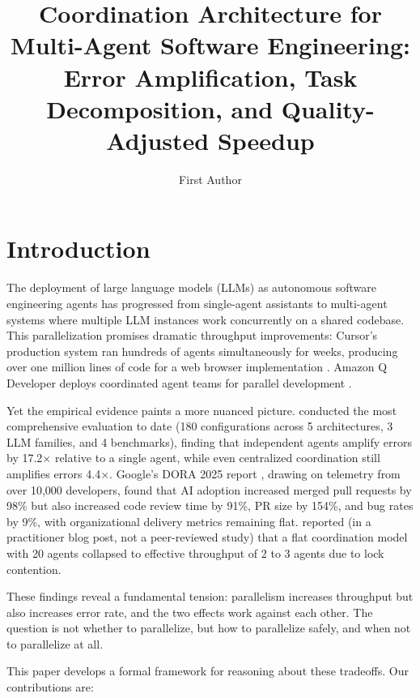 \documentclass[11pt, a4paper, logo, copyright]{googledeepmind}
\title{Coordination Architecture for Multi-Agent Software Engineering: Error Amplification, Task Decomposition, and Quality-Adjusted Speedup}
\author[1]{First Author}
\affil[1]{Pragnition Labs}
\begin{document}
\maketitle

\section{Introduction}
\label{sec:intro}

The deployment of large language models (LLMs) as autonomous software engineering agents has progressed from single-agent assistants to multi-agent systems where multiple LLM instances work concurrently on a shared codebase.
This parallelization promises dramatic throughput improvements: Cursor's production system ran hundreds of agents simultaneously for weeks, producing over one million lines of code for a web browser implementation \citep{Cursor2026}.
Amazon Q Developer deploys coordinated agent teams for parallel development \citep{Osmani2025}.

Yet the empirical evidence paints a more nuanced picture.
\citet{Kim2025} conducted the most comprehensive evaluation to date (180 configurations across 5 architectures, 3 LLM families, and 4 benchmarks), finding that independent agents amplify errors by 17.2$\times$ relative to a single agent, while even centralized coordination still amplifies errors 4.4$\times$.
Google's DORA 2025 report \citep{DORA2025}, drawing on telemetry from over 10,000 developers, found that AI adoption increased merged pull requests by 98\% but also increased code review time by 91\%, PR size by 154\%, and bug rates by 9\%, with organizational delivery metrics remaining flat.
\citet{Cursor2026} reported (in a practitioner blog post, not a peer-reviewed study) that a flat coordination model with 20 agents collapsed to effective throughput of 2 to 3 agents due to lock contention.

These findings reveal a fundamental tension: parallelism increases throughput but also increases error rate, and the two effects work against each other.
The question is not whether to parallelize, but how to parallelize safely, and when not to parallelize at all.

This paper develops a formal framework for reasoning about these tradeoffs.
Our contributions are:
\end{document}
